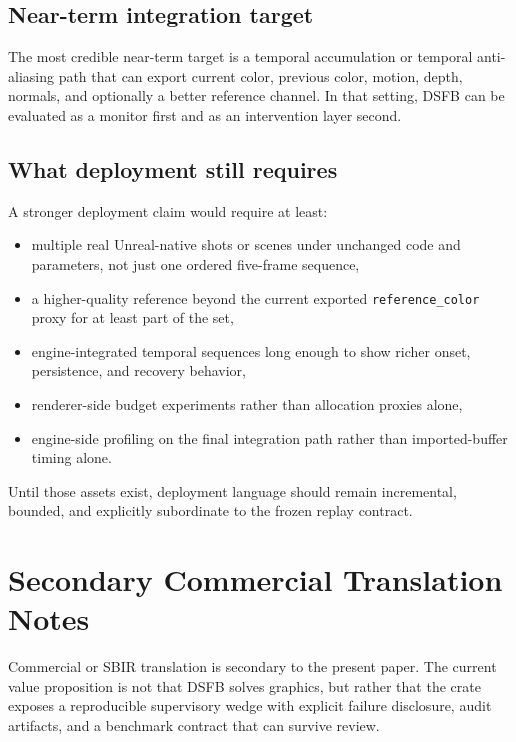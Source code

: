 \documentclass[11pt,letterpaper]{article}
\theoremstyle{gcresult}
\theoremstyle{definition}
\begin{document}
\subsection{Near-term integration target}

The most credible near-term target is a temporal accumulation or temporal anti-aliasing path that can export current color, previous color, motion, depth, normals, and optionally a better reference channel. In that setting, DSFB can be evaluated as a monitor first and as an intervention layer second.

\subsection{What deployment still requires}

A stronger deployment claim would require at least:
\begin{itemize}[leftmargin=1.5em]
    \item multiple real Unreal-native shots or scenes under unchanged code and parameters, not just one ordered five-frame sequence,
    \item a higher-quality reference beyond the current exported \texttt{reference\_color} proxy for at least part of the set,
    \item engine-integrated temporal sequences long enough to show richer onset, persistence, and recovery behavior,
    \item renderer-side budget experiments rather than allocation proxies alone,
    \item engine-side profiling on the final integration path rather than imported-buffer timing alone.
\end{itemize}

Until those assets exist, deployment language should remain incremental, bounded, and explicitly subordinate to the frozen replay contract.

\section{Secondary Commercial Translation Notes}
\label{sec:commercial}

Commercial or SBIR translation is secondary to the present paper. The current value proposition is not that DSFB solves graphics, but rather that the crate exposes a reproducible supervisory wedge with explicit failure disclosure, audit artifacts, and a benchmark contract that can survive review.
\end{document}

